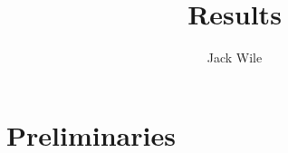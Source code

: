 \documentclass[12pt]{article}
\title{Results}
\author{Jack Wile}
\date{}
\begin{document}
\maketitle
\section*{Preliminaries}

\end{document}
